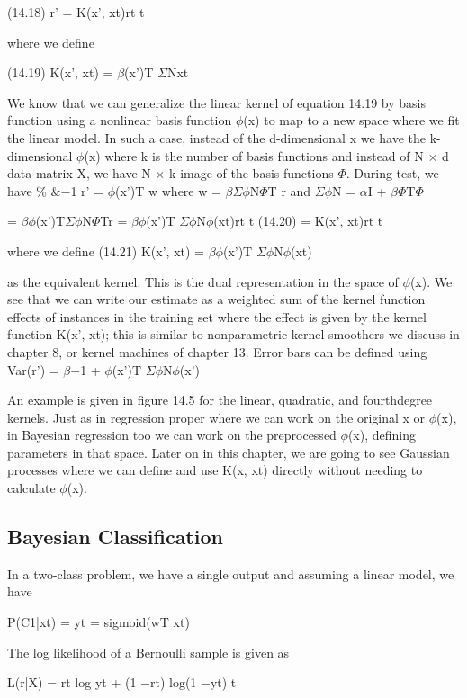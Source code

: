 (14.18) r' = K(x', xt)rt t

where we define

(14.19) K(x', xt) = $\beta$(x')T $\Sigma$Nxt

We know that we can generalize the linear kernel of equation 14.19 by basis function using a nonlinear basis function $\phi$(x) to map to a new space where we fit the linear model. In such a case, instead of the d-dimensional x we have the k-dimensional $\phi$(x) where k is the number of basis functions and instead of N $\times$ d data matrix X, we have N $\times$ k image of the basis functions $\Phi$. During test, we have \% \&$-$1 r' = $\phi$(x')T w where w = $\beta$$\Sigma$$\phi$N$\Phi$T r and $\Sigma$$\phi$N = $\alpha$I + $\beta$$\Phi$T$\Phi$

= $\beta$$\phi$(x')T$\Sigma$$\phi$N$\Phi$Tr = $\beta$$\phi$(x')T $\Sigma$$\phi$N$\phi$(xt)rt t (14.20) = K(x', xt)rt t

where we define (14.21) K(x', xt) = $\beta$$\phi$(x')T $\Sigma$$\phi$N$\phi$(xt)

as the equivalent kernel. This is the dual representation in the space of $\phi$(x). We see that we can write our estimate as a weighted sum of the kernel function effects of instances in the training set where the effect is given by the kernel function K(x', xt); this is similar to nonparametric kernel smoothers we discuss in chapter 8, or kernel machines of chapter 13. Error bars can be defined using Var(r') = $\beta$$-$1 + $\phi$(x')T $\Sigma$$\phi$N$\phi$(x')

An example is given in figure 14.5 for the linear, quadratic, and fourthdegree kernels. Just as in regression proper where we can work on the original x or $\phi$(x), in Bayesian regression too we can work on the preprocessed $\phi$(x), defining parameters in that space. Later on in this chapter, we are going to see Gaussian processes where we can define and use K(x, xt) directly without needing to calculate $\phi$(x).

\subsection{Bayesian Classification}

In a two-class problem, we have a single output and assuming a linear model, we have

P(C1|xt) = yt = sigmoid(wT xt)

The log likelihood of a Bernoulli sample is given as

L(r|X) = rt log yt + (1 $-$rt) log(1 $-$yt) t

